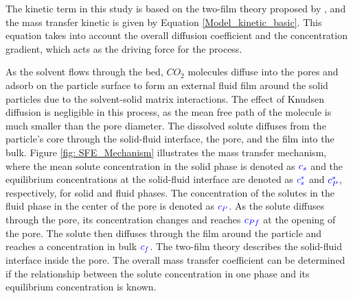 \documentclass[../Article_Model_Parameters.tex]{subfiles}
\begin{document}
	The kinetic term in this study is based on the two-film theory proposed by \citet{Reverchon1996}, and the mass transfer kinetic is given by Equation \ref{Model_kinetic_basic}. This equation takes into account the overall diffusion coefficient and the concentration gradient, which acts as the driving force for the process.
	
	
	As the solvent flows through the bed, $CO_2$ molecules diffuse into the pores and adsorb on the particle surface to form an external fluid film around the solid particles due to the solvent-solid matrix interactions. The effect of Knudsen diffusion is negligible in this process, as the mean free path of the molecule is much smaller than the pore diameter. The dissolved solute diffuses from the particle's core through the solid-fluid interface, the pore, and the film into the bulk. Figure \ref{fig: SFE_Mechanism} illustrates the mass transfer mechanism, where the mean solute concentration in the solid phase is denoted as ${\color{blue}c_s}$ and the equilibrium concentrations at the solid-fluid interface are denoted as ${\color{blue}c_s^*}$ and ${\color{blue}c_P^*}$, respectively, for solid and fluid phases. The concentration of the solutes in the fluid phase in the center of the pore is denoted as ${\color{blue}c_{P}}$. As the solute diffuses through the pore, its concentration changes and reaches ${\color{blue}c_{Pf}}$ at the opening of the pore. The solute then diffuses through the film around the particle and reaches a concentration in bulk ${\color{blue}c_f}$. The two-film theory describes the solid-fluid interface inside the pore. The overall mass transfer coefficient can be determined if the relationship between the solute concentration in one phase and its equilibrium concentration is known.
			
\end{document}
